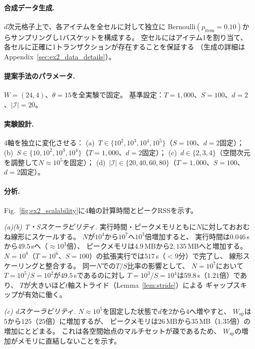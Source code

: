 \paragraph{合成データ生成.}
$d$次元格子上で、各アイテムを全セルに対して独立に
Bernoulli$(p_{\mathrm{item}}{=}0.10)$からサンプリングし1バスケットを構成する。
空セルにはアイテム1を割り当て、各セルに正確に1トランザクションが存在することを保証する
（生成の詳細はAppendix~\ref{sec:ex2_data_details}）。

\paragraph{提案手法のパラメータ.}
$W = (24, 4)$、$\theta = 15$を全実験で固定。
基準設定：$T{=}1{,}000$、$S{=}100$、$d{=}2$、$|\mathcal{I}|{=}20$。

\paragraph{実験設計.}
4軸を独立に変化させる：
(a)~$T \in \{10^2, 10^3, 10^4, 10^5\}$（$S{=}100$、$d{=}2$固定）；
(b)~$S \in \{10, 10^2, 10^3, 10^4\}$（$T{=}1{,}000$、$d{=}2$固定）；
(c)~$d \in \{2, 3, 4\}$（空間次元を調整して$N{\approx}10^5$を固定）；
(d)~$|\mathcal{I}| \in \{20, 40, 60, 80\}$（$T{=}1{,}000$、$S{=}100$、$d{=}2$固定）。

\paragraph{分析.}
Fig.~\ref{fig:ex2_scalability}に4軸の計算時間とピークRSSを示す。

\emph{(a)(b) T・Sスケーラビリティ.}
実行時間・ピークメモリともに$N$に対しておおむね線形にスケールする。
$N$が$10^4$から$10^7$へ$10^3$倍増加すると、
実行時間は$0.046$\,sから$49.5$\,sへ（${\approx}10^3$倍）、
ピークメモリは$4.9$\,MBから$2{,}135$\,MBへと増加する。
$N{=}10^8$（$T{=}10^6$、$S{=}100$）の拡張実行では$517$\,s（$<9$分）で完了し、
線形スケーリングと整合する。
同一$N$での$T/S$比率の影響として、
$N{=}10^7$において$T{=}10^5$/$S{=}10^2$が$49.5$\,sであるのに対し
$T{=}10^3$/$S{=}10^4$は$59.8$\,s（$1.21$倍）であり、
$T$が大きいほど$t$軸ストライド（Lemma~\ref{lem:stride}）による
ギャップスキップが有効に働く。

\emph{(c) dスケーラビリティ.}
$N{\approx}10^5$を固定した状態で$d$を$2$から$4$へ増やすと、
$W_{\mathrm{sp}}$は$5$から$125$（$25$倍）に増加するが、
ピークメモリは$26$\,MBから$35$\,MB（$1.35$倍）の増加にとどまる。
これは各空間始点のマルチセットが疎であるため、
$W_{\mathrm{sp}}$の増加がメモリに直結しないことを示す。

